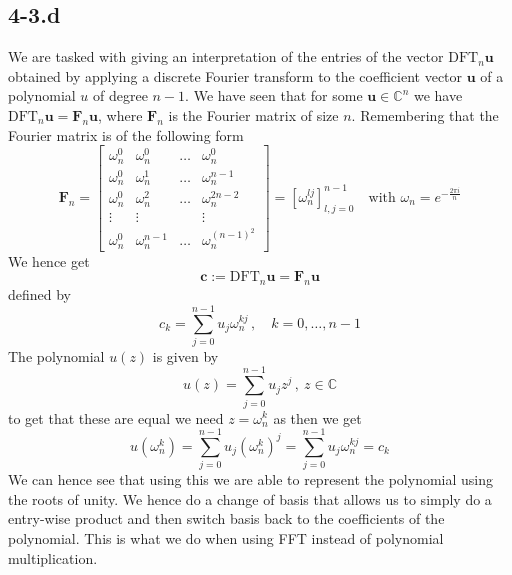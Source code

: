 \documentclass{article}
\begin{document}
\subsection*{4-3.d}
We are tasked with giving an interpretation of the entries of the vector $\mathrm{DFT}_{n}\mathbf{u}$ obtained by applying a discrete Fourier transform to the coefficient vector $\mathbf{u}$ of a polynomial $u$ of degree $n-1$. We have seen that for some $\mathbf{u} \in \mathbb{C}^{n}$ we have $\mathrm{DFT}_{n}\mathbf{u} = \mathbf{F}_{n}\mathbf{u}$, where $\mathbf{F}_{n}$ is the Fourier matrix of size $n$. Remembering that the Fourier matrix is of the following form
\begin{equation*}
    \mathbf{F}_{n} = 
    \begin{bmatrix}
    \omega_{n}^{0} & \omega_{n}^{0} & \dots & \omega_{n}^{0} \\[1mm]
    \omega_{n}^{0} & \omega_{n}^{1} & \dots & \omega_{n}^{n-1} \\[1mm]
    \omega_{n}^{0} & \omega_{n}^{2} & \dots & \omega_{n}^{2n-2} \\[1mm]
    \vdots & \vdots & & \vdots \\[1mm]
    \omega_{n}^{0} & \omega_{n}^{n-1} & \dots & \omega_{n}^{\left(n-1\right)^{2}}
    \end{bmatrix} = \left[\omega_{n}^{lj}\right]_{l,j=0}^{n-1} \quad \text{with } \omega_{n} = e^{-\frac{2\pi i}{n}}
\end{equation*}
We hence get 
\begin{equation*}
    \mathbf{c} := \mathrm{DFT}_{n}\mathbf{u} = \mathbf{F}_{n}\mathbf{u}
\end{equation*}
defined by
\begin{equation*}
    c_{k} = \sum_{j=0}^{n-1}u_{j}\omega_{n}^{kj}\,,\quad k = 0, \dots, n-1
\end{equation*}
The polynomial $u\left(z\right)$ is given by
\begin{equation*}
    u\left(z\right) = \sum_{j=0}^{n-1}u_{j}z^{j}\,,\: z \in \mathbb{C}
\end{equation*}
to get that these are equal we need $z = \omega_{n}^{k}$ as then we get 
\begin{equation*}
   u\left(\omega_{n}^{k}\right) = \sum_{j=0}^{n-1}u_{j}\left(\omega_{n}^{k}\right)^{j} = \sum_{j=0}^{n-1}u_{j}\omega_{n}^{kj} = c_{k}
\end{equation*}
We can hence see that using this we are able to represent the polynomial using the roots of unity. We hence do a change of basis that allows us to simply do a entry-wise product and then switch basis back to the coefficients of the polynomial. This is what we do when using FFT instead of polynomial multiplication.
\end{document}
